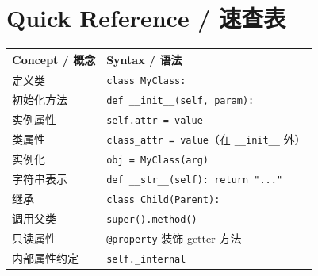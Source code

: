 \documentclass[11pt,a4paper]{article}
\begin{document}
\section{Quick Reference / 速查表}

\begin{table}[h]
\centering
\small
\renewcommand{\arraystretch}{1.3}
\begin{tabular}{@{}ll@{}}
\toprule
\textbf{Concept / 概念} & \textbf{Syntax / 语法} \\ \midrule
定义类 & \texttt{class MyClass:} \\
初始化方法 & \texttt{def \_\_init\_\_(self, param):} \\
实例属性 & \texttt{self.attr = value} \\
类属性 & \texttt{class\_attr = value}（在 \texttt{\_\_init\_\_} 外） \\
实例化 & \texttt{obj = MyClass(arg)} \\
字符串表示 & \texttt{def \_\_str\_\_(self): return "..."} \\
继承 & \texttt{class Child(Parent):} \\
调用父类 & \texttt{super().method()} \\
只读属性 & \texttt{@property} 装饰 getter 方法 \\
内部属性约定 & \texttt{self.\_internal} \\ \bottomrule
\end{tabular}
\end{table}
\end{document}

